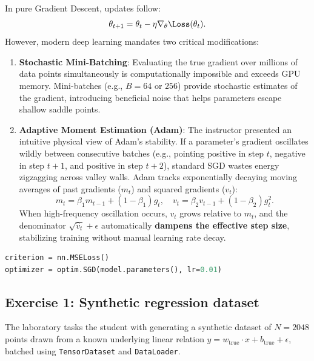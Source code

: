 \documentclass[../labs.tex]{subfiles}
\begin{document}
\begin{deepdive}
In pure Gradient Descent, updates follow:
\begin{equation}
\theta_{t+1} = \theta_t - \eta \nabla_\theta \Loss(\theta_t).
\end{equation}
However, modern deep learning mandates two critical modifications:
\begin{enumerate}
    \item \textbf{Stochastic Mini-Batching}: Evaluating the true gradient over millions of data points simultaneously is computationally impossible and exceeds GPU memory. Mini-batches (e.g., $B = 64$ or $256$) provide stochastic estimates of the gradient, introducing beneficial noise that helps parameters escape shallow saddle points.
    \item \textbf{Adaptive Moment Estimation (Adam)}: The instructor presented an intuitive physical view of Adam's stability. If a parameter's gradient oscillates wildly between consecutive batches (e.g., pointing positive in step $t$, negative in step $t+1$, and positive in step $t+2$), standard SGD wastes energy zigzagging across valley walls. Adam tracks exponentially decaying moving averages of past gradients ($m_t$) and squared gradients ($v_t$):
    \begin{equation}
    m_t = \beta_1 m_{t-1} + (1 - \beta_1) g_t, \quad v_t = \beta_2 v_{t-1} + (1 - \beta_2) g_t^2.
    \end{equation}
    When high-frequency oscillation occurs, $v_t$ grows relative to $m_t$, and the denominator $\sqrt{\hat{v}_t} + \epsilon$ automatically \textbf{dampens the effective step size}, stabilizing training without manual learning rate decay.
\end{enumerate}
\end{deepdive}

\begin{lstlisting}[language=Python, caption={Configuring loss function and SGD optimizer (Cell 20).}, label={lst:lab01_criterion_opt}]
criterion = nn.MSELoss()
optimizer = optim.SGD(model.parameters(), lr=0.01)
\end{lstlisting}

\subsection{Exercise 1: Synthetic regression dataset}
The laboratory tasks the student with generating a synthetic dataset of $N = 2048$ points drawn from a known underlying linear relation $y = w_{\text{true}} \cdot x + b_{\text{true}} + \epsilon$, batched using \texttt{TensorDataset} and \texttt{DataLoader}.
\end{document}
